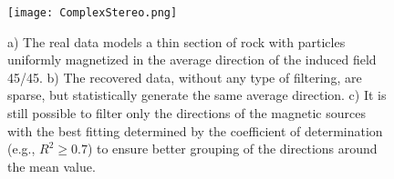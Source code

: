 \begin{singlespace}
\begin{figure}[hbpt]
\centering
\texttt{[image: ComplexStereo.png]}
\caption{a) The real data models a thin section of rock with particles uniformly magnetized in the average direction of the induced field 45\textdegree/45\textdegree. b) The recovered data, without any type of filtering, are sparse, but statistically generate the same average direction. c) It is still possible to filter only the directions of the magnetic sources with the best fitting determined by the coefficient of determination (e.g., $R^ 2 \geq 0.7$) to ensure better grouping of the directions around the mean value.}
\label{fig:ComplexSynthetic3}
\end{figure}

\end{singlespace}